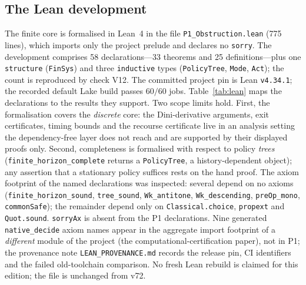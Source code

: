 \documentclass[11pt,a4paper]{article}
\theoremstyle{plain}
\theoremstyle{definition}
\theoremstyle{remark}
\begin{document}
\subsection{The Lean development}\label{S:lean}
The finite core is formalised in Lean~4 in the file \texttt{P1\_Obstruction.lean} (775 lines), which imports only the project prelude and declares no \texttt{sorry}. The development comprises 58 declarations---33 theorems and 25 definitions---plus one \texttt{structure} (\texttt{FinSys}) and three \texttt{inductive} types (\texttt{PolicyTree}, \texttt{Mode}, \texttt{Act}); the count is reproduced by check V12. The committed project pin is Lean \texttt{v4.34.1}; the recorded default Lake build passes $60/60$ jobs. Table~\ref{tab:lean} maps the declarations to the results they support. Two scope limits hold. First, the formalisation covers the \emph{discrete} core: the Dini-derivative arguments, exit certificates, timing bounds and the recourse certificate live in an analysis setting the dependency-free layer does not reach and are supported by their displayed proofs only. Second, completeness is formalised with respect to policy \emph{trees} (\texttt{finite\_horizon\_complete} returns a \texttt{PolicyTree}, a history-dependent object); any assertion that a stationary policy suffices rests on the hand proof. The axiom footprint of the named declarations was inspected: several depend on no axioms (\texttt{finite\_horizon\_sound}, \texttt{tree\_sound}, \texttt{Wk\_antitone}, \texttt{Wk\_descending}, \texttt{preOp\_mono}, \texttt{commonSafe}); the remainder depend only on \texttt{Classical.choice}, \texttt{propext} and \texttt{Quot.sound}. \texttt{sorryAx} is absent from the P1 declarations. Nine generated \texttt{native\_decide} axiom names appear in the aggregate import footprint of a \emph{different} module of the project (the computational-certification paper), not in P1; the provenance note \texttt{LEAN\_PROVENANCE.md} records the release pin, CI identifiers and the failed old-toolchain comparison. No fresh Lean rebuild is claimed for this edition; the file is unchanged from v72.
\end{document}
